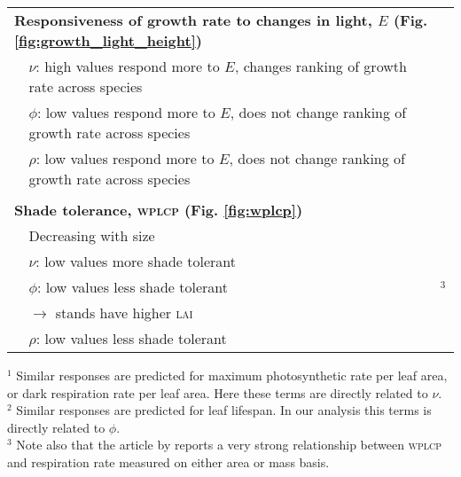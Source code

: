 \documentclass[a4paper,11pt]{article}
\begin{document}
\begin{table}[ht]
{{\begin{tabular}{p{0.01cm}p{7.5cm}p{7cm}}
  \\ \multicolumn{3}{l}{\bf{Responsiveness of growth rate to changes in light, $E$} (Fig. \ref{fig:growth_light_height})}\\
  & $\nu$: high values respond more to $E$, changes ranking of growth rate across species & \\
  & $\phi$: low values respond more to $E$, does not change ranking of growth rate across species & \\
  & $\rho$: low values respond more to $E$, does not change ranking of growth rate across species & \citet{Ruger-2012}\\

  \\ \multicolumn{3}{l}{\bf{Shade tolerance, \textsc{wplcp}} (Fig. \ref{fig:wplcp})}\\
  & Decreasing with size & \citet{Givnish-1988, Kneeshaw-2006, Lusk-2008}\\
  & $\nu$: low values more shade tolerant &  \citet{Messier-1999, Craine-2005,Baltzer-2007}\\
  & $\phi$: low values less shade tolerant & \citet{Messier-1999, Poorter-2006, Baltzer-2007, Lusk-2008}$^3$\\
  & \quad $\rightarrow$ stands have higher \textsc{lai} &  \citet{Reich-1992, Gower-1993, Niinemets-2010} \\
  & $\rho$: low values less shade tolerant  &  \citet{Osunkoya-1996}\\
  \hline
  \end{tabular}
  }
$^1$ Similar responses are predicted for maximum photosynthetic rate per leaf area, or dark respiration rate per leaf area. Here these terms are directly related to $\nu$.\\
$^2$ Similar responses are predicted for leaf lifespan. In our analysis this terms is directly related to $\phi$.\\
$^3$ Note also that the article by \citet{Baltzer-2007} reports a very strong relationship between \textsc{wplcp} and respiration rate measured on either area or mass basis.\\

}
\label{tab:phenomena}
\end{table}

\newpage
\end{document}
